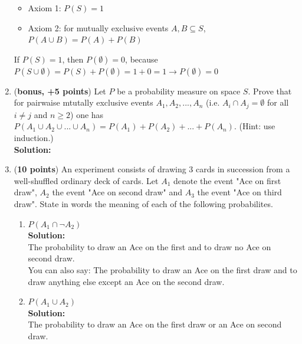 \documentclass[a4paper]{article}
\begin{document}
\begin{enumerate}
\begin{itemize}
	\item Axiom 1: $P(S) = 1$
	\item Axiom 2: for mutually exclusive events $A,B \subseteq S$, $P(A \cup B) = P(A) + P(B)$
\end{itemize}

If $P(S) = 1$, then $P(\emptyset) = 0$, because $P(S \cup \emptyset) = P(S) + P(\emptyset) = 1 + 0 = 1 \rightarrow P(\emptyset) = 0$\\





\item (\textbf{bonus, +5 points}) Let $P$ be a probability measure on space $S$. Prove that for pairwaise mtutally exclusive events $A_1, A_2,...,A_n$ (i.e. $A_i \cap A_j = \emptyset$ for all $i \neq j$ and $n \geq 2$) one has $P(A_1 \cup A_2 \cup ... \cup A_n) = P(A_1) + P(A_2) + ... + P(A_n).$ (Hint: use induction.)\\
\textbf{Solution:}\\




\item (\textbf{10 points}) An experiment consists of drawing 3 cards in succession from a well-shuffled ordinary deck of cards. Let $A_1$ denote the event "Ace on first draw", $A_2$ the event "Ace on second draw" and $A_3$ the event "Ace on third draw". State in words the meaning of each of the following probabilites.\\


\begin{enumerate}
	\item $P(A_1 \cap \neg A_2)$\\
	\textbf{Solution:}\\
	
The probability to draw an Ace on the first and to draw no Ace on second draw.\\
You can also say: The probability to draw an Ace on the first draw and to draw anything else except an Ace on the second draw.\\	
	
	
	\item $P(A_1 \cup A_2)$\\
	\textbf{Solution:}\\
	
The probability to draw an Ace on the first draw or an Ace on second draw.\\	
	

\end{enumerate}
\end{enumerate}
\end{document}

